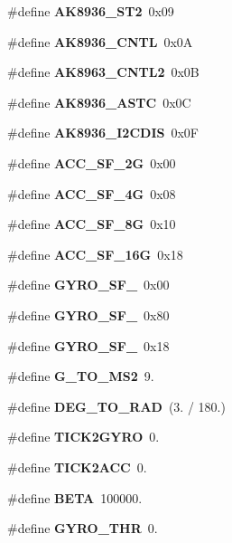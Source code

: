 \begin{DoxyCompactItemize}
\#define {\bfseries A\+K8936\+\_\+\+S\+T2}~0x09
\item 
\mbox{\label{_i_m_u__functions_8h_aaf1ccf81f01e11b6f97cbb1f56f9c31c}} 
\#define {\bfseries A\+K8936\+\_\+\+C\+N\+TL}~0x0A
\item 
\mbox{\label{_i_m_u__functions_8h_a22c3ba7c88d001a39b0f0d3c880c8993}} 
\#define {\bfseries A\+K8963\+\_\+\+C\+N\+T\+L2}~0x0B
\item 
\mbox{\label{_i_m_u__functions_8h_a951a7bb134f91b3966e4ab618a6db94d}} 
\#define {\bfseries A\+K8936\+\_\+\+A\+S\+TC}~0x0C
\item 
\mbox{\label{_i_m_u__functions_8h_a915e3e48f694500f0728e5c720134763}} 
\#define {\bfseries A\+K8936\+\_\+\+I2\+C\+D\+IS}~0x0F
\item 
\mbox{\label{_i_m_u__functions_8h_aba7d379977d1c4793eb8871c8ebc417a}} 
\#define {\bfseries A\+C\+C\+\_\+\+S\+F\+\_\+2G}~0x00
\item 
\mbox{\label{_i_m_u__functions_8h_ac9159339b9f5428ed16b7e794185e29f}} 
\#define {\bfseries A\+C\+C\+\_\+\+S\+F\+\_\+4G}~0x08
\item 
\mbox{\label{_i_m_u__functions_8h_ac9e0af9f1a9e4e07f306410e3c3a84d3}} 
\#define {\bfseries A\+C\+C\+\_\+\+S\+F\+\_\+8G}~0x10
\item 
\mbox{\label{_i_m_u__functions_8h_a08d2b56da01c25684a489faeb9a976e8}} 
\#define {\bfseries A\+C\+C\+\_\+\+S\+F\+\_\+16G}~0x18
\item 
\mbox{\label{_i_m_u__functions_8h_ae6de0bc596530ecf09f3da43529588d0}} 
\#define {\bfseries G\+Y\+R\+O\+\_\+\+S\+F\+\_}~0x00
\item 
\mbox{\label{_i_m_u__functions_8h_ad0973081208e9cfda92705d5f361446b}} 
\#define {\bfseries G\+Y\+R\+O\+\_\+\+S\+F\+\_}~0x80
\item 
\mbox{\label{_i_m_u__functions_8h_aa58d6861fcbbdc86f79c2920fbeafcc0}} 
\#define {\bfseries G\+Y\+R\+O\+\_\+\+S\+F\+\_}~0x18
\item 
\mbox{\label{_i_m_u__functions_8h_a1078273b65a944f3966c004fcbe7cb2c}} 
\#define {\bfseries G\+\_\+\+T\+O\+\_\+\+M\+S2}~9.
\item 
\mbox{\label{_i_m_u__functions_8h_a212460e743fecb084d717bb2180c5a56}} 
\#define {\bfseries D\+E\+G\+\_\+\+T\+O\+\_\+\+R\+AD}~(3. / 180.)
\item 
\mbox{\label{_i_m_u__functions_8h_a447fa9b5c261de8bd2c70d7bb68f9fad}} 
\#define {\bfseries T\+I\+C\+K2\+G\+Y\+RO}~0.
\item 
\mbox{\label{_i_m_u__functions_8h_a553b95dd1fedb0cc5c10f6291e5e1516}} 
\#define {\bfseries T\+I\+C\+K2\+A\+CC}~0.
\item 
\mbox{\label{_i_m_u__functions_8h_a1b996515309fc3c03449912bb33046e3}} 
\#define {\bfseries B\+E\+TA}~100000.
\item 
\mbox{\label{_i_m_u__functions_8h_a11f6bcc58aee4b8a1346110de1046108}} 
\#define {\bfseries G\+Y\+R\+O\+\_\+\+T\+HR}~0.
\end{DoxyCompactItemize}
